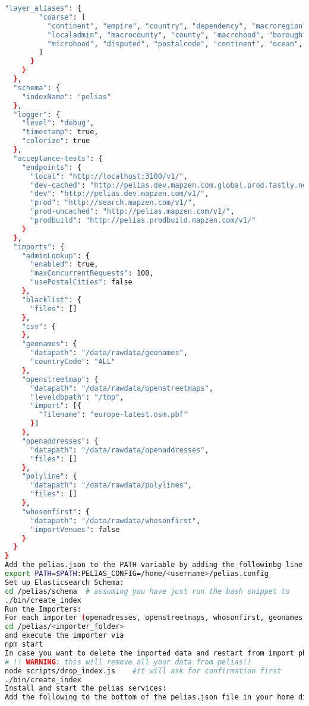 \begin{lstlisting}[language=bash,breaklines=true]
      "layer_aliases": {
        "coarse": [
          "continent", "empire", "country", "dependency", "macroregion", "region", "locality",
          "localadmin", "macrocounty", "county", "macrohood", "borough", "neighbourhood",
          "microhood", "disputed", "postalcode", "continent", "ocean", "marinearea"
        ]
      }
    }
  },
  "schema": {
    "indexName": "pelias"
  },
  "logger": {
    "level": "debug",
    "timestamp": true,
    "colorize": true
  },
  "acceptance-tests": {
    "endpoints": {
      "local": "http://localhost:3100/v1/",
      "dev-cached": "http://pelias.dev.mapzen.com.global.prod.fastly.net/v1/",
      "dev": "http://pelias.dev.mapzen.com/v1/",
      "prod": "http://search.mapzen.com/v1/",
      "prod-uncached": "http://pelias.mapzen.com/v1/",
      "prodbuild": "http://pelias.prodbuild.mapzen.com/v1/"
    }
  },
  "imports": {
    "adminLookup": {
      "enabled": true,
      "maxConcurrentRequests": 100,
      "usePostalCities": false
    },
    "blacklist": {
      "files": []
    },
    "csv": {
    },
    "geonames": {
      "datapath": "/data/rawdata/geonames",
      "countryCode": "ALL"
    },
    "openstreetmap": {
      "datapath": "/data/rawdata/openstreetmaps",
      "leveldbpath": "/tmp",
      "import": [{
        "filename": "europe-latest.osm.pbf"
      }]
    },
    "openaddresses": {
      "datapath": "/data/rawdata/openaddresses",
      "files": []
    },
    "polyline": {
      "datapath": "/data/rawdata/polylines",
      "files": []
    },
    "whosonfirst": {
      "datapath": "/data/rawdata/whosonfirst",
      "importVenues": false
    }
  }
}
Add the pelias.json to the PATH variable by adding the followinbg line at the bottom of the .bashrc-file:
export PATH=$PATH:PELIAS_CONFIG=/home/<username>/pelias.config
Set up Elasticsearch Schema:
cd /pelias/schema  # assuming you have just run the bash snippet to 			  download the repos from earlier
./bin/create_index
Run the Importers:
For each importer (openadresses, openstreetmaps, whosonfirst, geonames and polylines) navigate into their folders under 
cd /pelias/<importer_folder>
and execute the importer via 
npm start
In case you want to delete the imported data and restart from import phase, run the following:
# !! WARNING: this will remove all your data from pelias!!
node scripts/drop_index.js    #it will ask for confirmation first
./bin/create_index
Install and start the pelias services:
Add the following to the bottom of the pelias.json file in your home directory. This will tell the pelias API to use all the services running locally and on their default ports.

\end{lstlisting}
